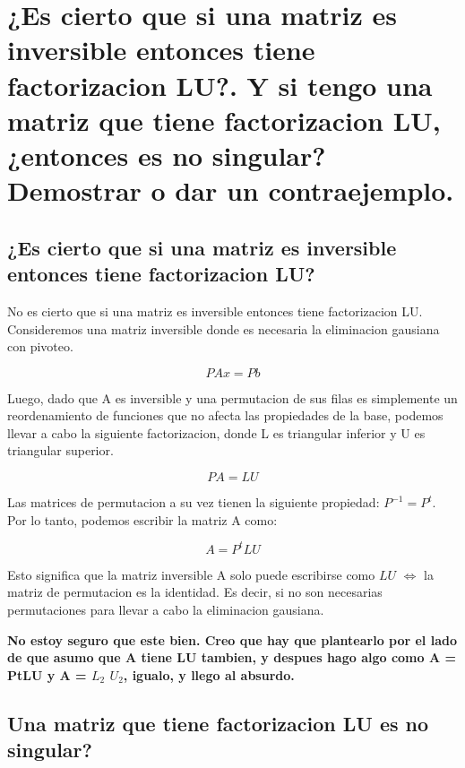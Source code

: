 \documentclass[10pt,a4paper]{article}
\begin{document}
\section{¿Es cierto que si una matriz es inversible entonces tiene factorizacion LU?. Y si tengo una matriz que tiene factorizacion LU, ¿entonces es no singular? Demostrar o dar un contraejemplo.}

\subsection{¿Es cierto que si una matriz es inversible entonces tiene factorizacion LU?}

No es cierto que si una matriz es inversible entonces tiene factorizacion LU. Consideremos una matriz inversible  donde es necesaria la eliminacion gausiana con pivoteo.

\begin{equation}
PAx = Pb
\end{equation}

Luego, dado que A es inversible y una permutacion de sus filas es simplemente un reordenamiento de funciones que no afecta las propiedades de la base, podemos llevar a cabo la siguiente factorizacion, donde L es triangular inferior y U es triangular superior.

\begin{equation}
PA = LU
\end{equation}

Las matrices de permutacion a su vez tienen la siguiente propiedad: $P^{-1} = P^t$. Por lo tanto, podemos escribir la matriz A como:

\begin{equation}
A = P^tLU
\end{equation}

Esto significa que la matriz inversible A solo puede escribirse como $LU$ $\iff$ la matriz de permutacion es la identidad. Es decir, si no son necesarias permutaciones para  llevar a cabo la eliminacion gausiana.

\textbf{No estoy seguro que este bien. Creo que hay que plantearlo por el lado de que asumo que A tiene LU tambien, y despues hago algo como A = PtLU y A = $L_2$ $U_2$, igualo, y llego al absurdo.}

\pagebreak

\subsection{Una matriz que tiene factorizacion LU es no singular?}
\end{document}
